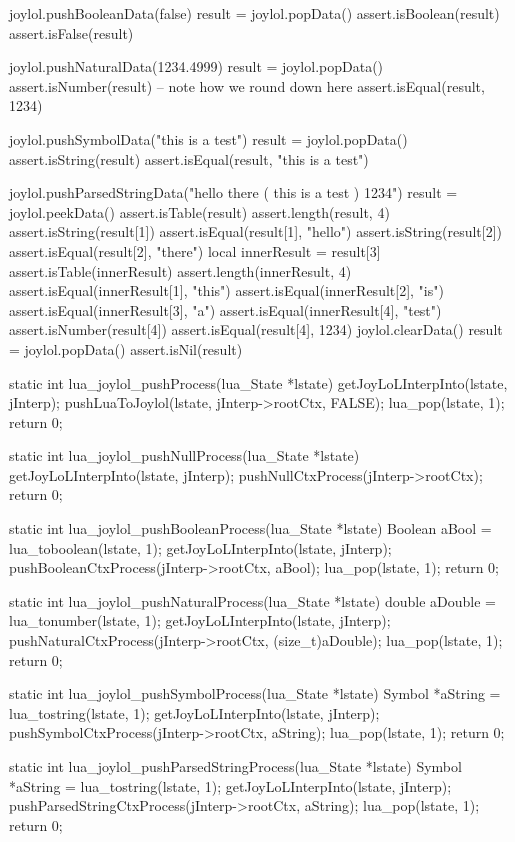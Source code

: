   joylol.pushBooleanData(false)
  result = joylol.popData()
  assert.isBoolean(result)
  assert.isFalse(result)
  
  joylol.pushNaturalData(1234.4999)
  result = joylol.popData()
  assert.isNumber(result)
  -- note how we round down here
  assert.isEqual(result, 1234)
  
  joylol.pushSymbolData("this is a test")
  result = joylol.popData()
  assert.isString(result)
  assert.isEqual(result, "this is a test")
  
  joylol.pushParsedStringData("hello there ( this is a test ) 1234")
  result = joylol.peekData()
  assert.isTable(result)
  assert.length(result, 4)
  assert.isString(result[1])
  assert.isEqual(result[1], "hello")
  assert.isString(result[2])
  assert.isEqual(result[2], "there")
  local innerResult = result[3]
  assert.isTable(innerResult)
  assert.length(innerResult, 4)
  assert.isEqual(innerResult[1], "this")
  assert.isEqual(innerResult[2], "is")
  assert.isEqual(innerResult[3], "a")
  assert.isEqual(innerResult[4], "test")
  assert.isNumber(result[4])
  assert.isEqual(result[4], 1234)
  joylol.clearData()
  result = joylol.popData()
  assert.isNil(result)
\stopLuaTest
\stopTestCase
\stopTestSuite

\startCCode
static int lua_joylol_pushProcess(lua_State *lstate) {
  getJoyLoLInterpInto(lstate, jInterp);
  pushLuaToJoylol(lstate, jInterp->rootCtx, FALSE);
  lua_pop(lstate, 1);
  return 0;
}

static int lua_joylol_pushNullProcess(lua_State *lstate) {
  getJoyLoLInterpInto(lstate, jInterp);
  pushNullCtxProcess(jInterp->rootCtx);
  return 0;
}

static int lua_joylol_pushBooleanProcess(lua_State *lstate) {
  Boolean aBool = lua_toboolean(lstate, 1);
  getJoyLoLInterpInto(lstate, jInterp);
  pushBooleanCtxProcess(jInterp->rootCtx, aBool);
  lua_pop(lstate, 1);
  return 0;
}

static int lua_joylol_pushNaturalProcess(lua_State *lstate) {
  double aDouble = lua_tonumber(lstate, 1);
  getJoyLoLInterpInto(lstate, jInterp);
  pushNaturalCtxProcess(jInterp->rootCtx, (size_t)aDouble);
  lua_pop(lstate, 1);
  return 0;
}

static int lua_joylol_pushSymbolProcess(lua_State *lstate) {
  Symbol *aString = lua_tostring(lstate, 1);
  getJoyLoLInterpInto(lstate, jInterp);
  pushSymbolCtxProcess(jInterp->rootCtx, aString);
  lua_pop(lstate, 1);
  return 0;
}

static int lua_joylol_pushParsedStringProcess(lua_State *lstate) {
  Symbol *aString = lua_tostring(lstate, 1);
  getJoyLoLInterpInto(lstate, jInterp);
  pushParsedStringCtxProcess(jInterp->rootCtx, aString);
  lua_pop(lstate, 1);
  return 0;
}

